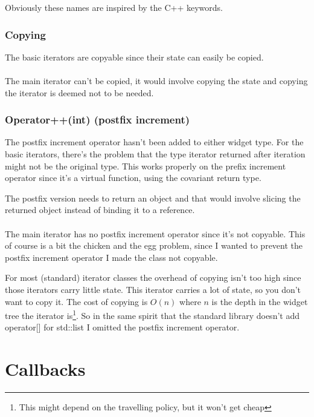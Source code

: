 \documentclass[a4paper,notitlepage,twocolumn,draft]{report}
\begin{document}
Obviously these names are inspired by the C++ keywords.

\subsubsection{Copying}

The basic iterators are copyable since their state can easily be copied.

\paragraph{}

The main iterator can't be copied, it would involve copying the state
and copying the iterator is deemed not to be needed.

\subsubsection{Operator++(int) (postfix increment)}

The postfix increment operator hasn't been added to either widget type. For the
basic iterators, there's the problem that the type iterator returned after
iteration might not be the original type. This works properly on the prefix
increment operator since it's a virtual function, using the covariant return
type.

The postfix version needs to return an object and that would involve slicing the
returned object instead of binding it to a reference.

\paragraph{}

The main iterator has no postfix increment operator since it's not copyable.
This of course is a bit the chicken and the egg problem, since I wanted to
prevent the postfix increment operator I made the class not copyable.

For most (standard) iterator classes the overhead of copying isn't too high
since those iterators carry little state.  This iterator carries a lot of state,
so you don't want to copy it. The cost of copying is $O(n)$ where $n$ is the
depth in the widget tree the iterator is\footnote{This might depend on the
travelling policy, but it won't get cheap}. So in the same spirit that the
standard library doesn't add operator[] for std::list I omitted the postfix
increment operator.


\section{Callbacks}
\end{document}
